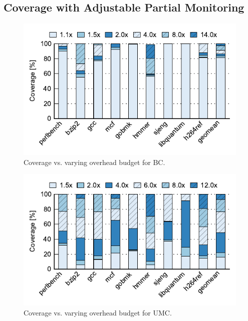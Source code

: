 \subsection{Coverage with Adjustable Partial Monitoring}

\begin{figure}
  \begin{center}
    \includegraphics[width=\linewidth]{figs/data_hb_sweep.pdf}
    \vspace{-0.2in}
    \caption{Coverage vs. varying overhead budget for BC.}
    \label{fig:evaluation.bc_sweep}
    \vspace{-0.3in}
  \end{center}
\end{figure}

\begin{figure}
  \begin{center}
    \includegraphics[width=\linewidth]{figs/data_umc_sweep.pdf}
    \vspace{-0.2in}
    \caption{Coverage vs. varying overhead budget for UMC.}
    \label{fig:evaluation.umc_sweep}
    \vspace{-0.2in}
  \end{center}
\end{figure}

